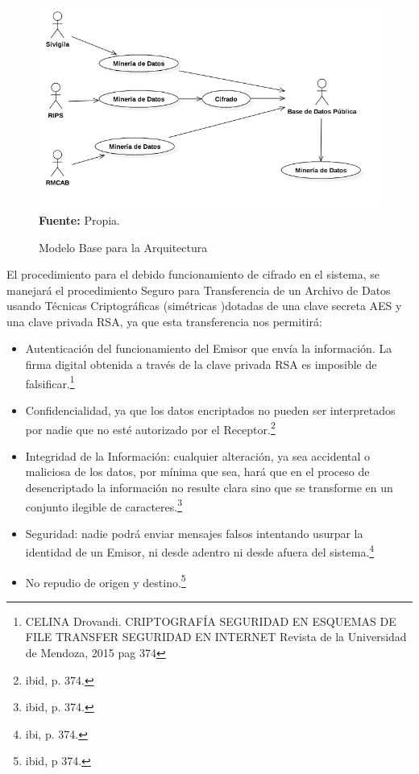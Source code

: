 \documentclass[a4paper,openright,12pt]{book}
\theoremstyle{definition}
\theoremstyle{remark}
\begin{document}
\begin{figure}[htb]
\centering
\caption{Modelo Base para la Arquitectura} 
\includegraphics[scale=0.4]{Diagrama_Arq}
\label{fig:Cifrado}
\\\textbf{Fuente:} Propia.
\end{figure}

El procedimiento para el debido funcionamiento de cifrado en el sistema, se manejará el procedimiento Seguro para Transferencia de un Archivo de Datos usando Técnicas Criptográficas (simétricas )dotadas de una clave secreta AES y una clave privada RSA, ya que esta transferencia nos permitirá:

\begin{itemize}
\item Autenticación del funcionamiento del Emisor que envía la información. La firma digital obtenida a través de la clave privada RSA es imposible de falsificar.\footnote{CELINA Drovandi. CRIPTOGRAFÍA
SEGURIDAD EN ESQUEMAS DE FILE TRANSFER SEGURIDAD EN INTERNET Revista de la Universidad de Mendoza, 2015 pag 374}
\item Confidencialidad, ya que los datos encriptados no pueden ser interpretados por nadie que no esté autorizado por el Receptor.\footnote{ibid, p. 374.}
\item Integridad de la Información: cualquier alteración, ya sea accidental o maliciosa de los datos, por mínima que sea, hará que en el proceso de desencriptado la información no resulte clara sino que se transforme en un conjunto ilegible de caracteres.\footnote{ibid, p. 374.}
\item Seguridad: nadie podrá enviar mensajes falsos intentando usurpar la identidad de un Emisor, ni desde adentro ni desde afuera del sistema.\footnote{ibi, p. 374.}
\item No repudio de origen y destino.\footnote{ibid, p 374.}
\end{itemize}
\end{document}
